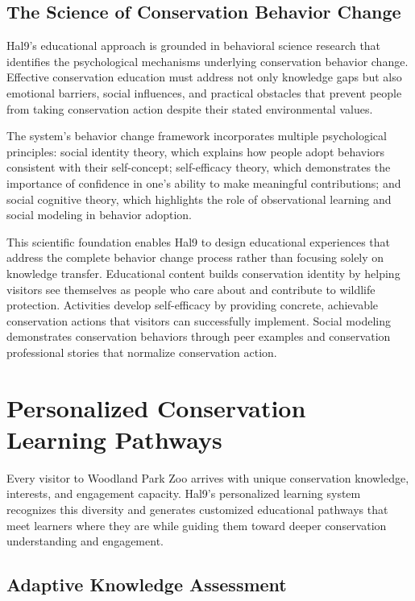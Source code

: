 \documentclass[
  Letterpaper,
]{scrbook}
\begin{document}
\subsection{The Science of Conservation Behavior
Change}\label{the-science-of-conservation-behavior-change}

Hal9's educational approach is grounded in behavioral science research
that identifies the psychological mechanisms underlying conservation
behavior change. Effective conservation education must address not only
knowledge gaps but also emotional barriers, social influences, and
practical obstacles that prevent people from taking conservation action
despite their stated environmental values.

The system's behavior change framework incorporates multiple
psychological principles: social identity theory, which explains how
people adopt behaviors consistent with their self-concept; self-efficacy
theory, which demonstrates the importance of confidence in one's ability
to make meaningful contributions; and social cognitive theory, which
highlights the role of observational learning and social modeling in
behavior adoption.

This scientific foundation enables Hal9 to design educational
experiences that address the complete behavior change process rather
than focusing solely on knowledge transfer. Educational content builds
conservation identity by helping visitors see themselves as people who
care about and contribute to wildlife protection. Activities develop
self-efficacy by providing concrete, achievable conservation actions
that visitors can successfully implement. Social modeling demonstrates
conservation behaviors through peer examples and conservation
professional stories that normalize conservation action.

\section{Personalized Conservation Learning
Pathways}\label{personalized-conservation-learning-pathways}

Every visitor to Woodland Park Zoo arrives with unique conservation
knowledge, interests, and engagement capacity. Hal9's personalized
learning system recognizes this diversity and generates customized
educational pathways that meet learners where they are while guiding
them toward deeper conservation understanding and engagement.

\subsection{Adaptive Knowledge
Assessment}\label{adaptive-knowledge-assessment}
\end{document}

